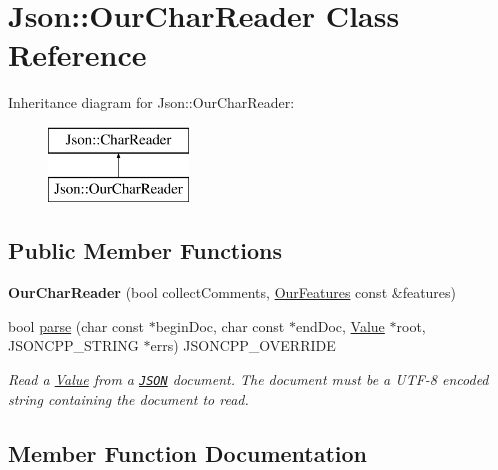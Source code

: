 \hypertarget{classJson_1_1OurCharReader}{}\section{Json\+:\+:Our\+Char\+Reader Class Reference}
\label{classJson_1_1OurCharReader}
Inheritance diagram for Json\+:\+:Our\+Char\+Reader\+:\begin{figure}[H]
\begin{center}
\leavevmode
\includegraphics[height=2.000000cm]{classJson_1_1OurCharReader}
\end{center}
\end{figure}
\subsection*{Public Member Functions}
\begin{DoxyCompactItemize}
\item 
\mbox{\label{classJson_1_1OurCharReader_a5015506620e7ba7bab417756fa1ca9fe}} 
{\bfseries Our\+Char\+Reader} (bool collect\+Comments, \hyperlink{classJson_1_1OurFeatures}{Our\+Features} const \&features)
\item 
bool \hyperlink{classJson_1_1OurCharReader_a547f08ec5a9951ca69e8bb2e90296c83}{parse} (char const $\ast$begin\+Doc, char const $\ast$end\+Doc, \hyperlink{classJson_1_1Value}{Value} $\ast$root, J\+S\+O\+N\+C\+P\+P\+\_\+\+S\+T\+R\+I\+NG $\ast$errs) J\+S\+O\+N\+C\+P\+P\+\_\+\+O\+V\+E\+R\+R\+I\+DE
\begin{DoxyCompactList}\small\item\em Read a \hyperlink{classJson_1_1Value}{Value} from a \href{http://www.json.org}{\tt J\+S\+ON} document. The document must be a U\+T\+F-\/8 encoded string containing the document to read. \end{DoxyCompactList}\end{DoxyCompactItemize}


\subsection{Member Function Documentation}
\mbox{\label{classJson_1_1OurCharReader_a547f08ec5a9951ca69e8bb2e90296c83}} 
